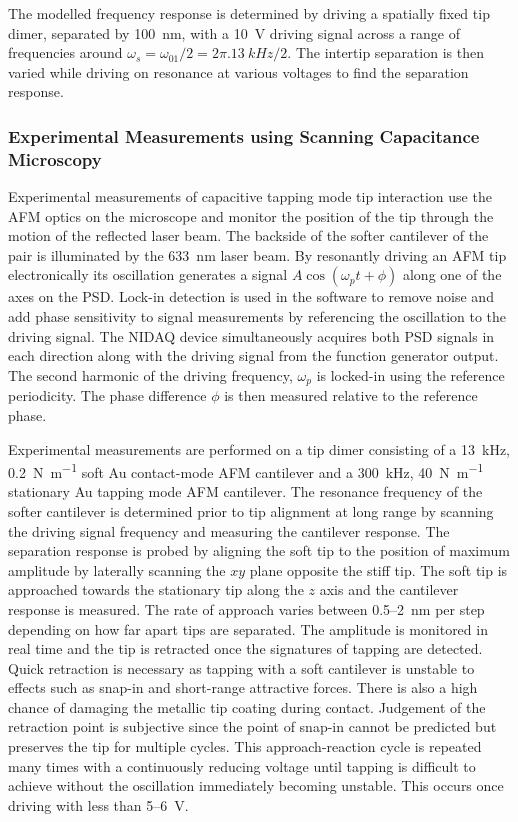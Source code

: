 \documentclass{article}
\begin{document}
The modelled frequency response is determined by driving a spatially fixed tip dimer, separated by \SI{100}{nm}, with a \SI{10}{V} driving signal across a range of frequencies around $\omega_s = \omega_{01}/2 = 2\pi.\SI{13}{kHz}/2$. The intertip separation is then varied while driving on resonance at various voltages to find the separation response.

\subsubsection{Experimental Measurements using Scanning Capacitance Microscopy}

Experimental measurements of capacitive tapping mode tip interaction use the AFM optics on the microscope and monitor the position of the tip through the motion of the reflected laser beam. The backside of the softer cantilever of the pair is illuminated by the \SI{633}{nm} laser beam. By resonantly driving an AFM tip electronically its oscillation generates a signal $A\cos(\omega_p t + \phi)$ along one of the axes on the PSD. Lock-in detection is used in the software to remove noise and add phase sensitivity to signal measurements by referencing the oscillation to the driving signal. The NIDAQ device simultaneously acquires both PSD signals in each direction along with the driving signal from the function generator output. The second harmonic of the driving frequency, $\omega_p$ is locked-in using the reference periodicity. The phase difference $\phi$ is then measured relative to the reference phase.%

Experimental measurements are performed on a tip dimer consisting of a \SI{13}{kHz}, \SI{0.2}{N.m^{-1}} soft Au contact-mode AFM cantilever and a \SI{300}{kHz}, \SI{40}{N.m^{-1}} stationary Au tapping mode AFM cantilever. The resonance frequency of the softer cantilever is determined prior to tip alignment at long range by scanning the driving signal frequency and measuring the cantilever response. The separation response is probed by aligning the soft tip to the position of maximum amplitude by laterally scanning the $xy$ plane opposite the stiff tip. The soft tip is approached towards the stationary tip along the $z$ axis and the cantilever response is measured. The rate of approach varies between 0.5--\SI{2}{nm} per step depending on how far apart tips are separated. The amplitude is monitored in real time and the tip is retracted once the signatures of tapping are detected. Quick retraction is necessary as tapping with a soft cantilever is unstable to effects such as snap-in and short-range attractive forces. There is also a high chance of damaging the metallic tip coating during contact. Judgement of the retraction point is subjective since the point of snap-in cannot be predicted but preserves the tip for multiple cycles. This approach-reaction cycle is repeated many times with a continuously reducing voltage until tapping is difficult to achieve without the oscillation immediately becoming unstable. This occurs once driving with less than 5--\SI{6}{V}.
\end{document}
